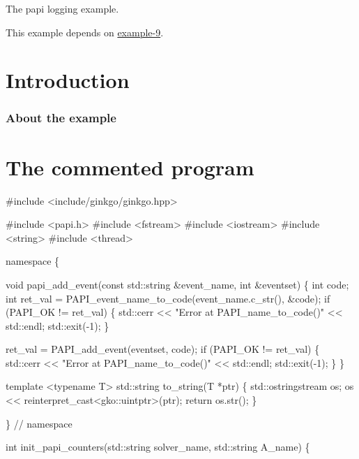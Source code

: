 The papi logging example.

This example depends on \hyperlink{example_9}{example-\/9}.

 \label{_Intro}%
 \label{_Introduction}%
\section*{Introduction}

\label{_Abouttheexample}%
\subsubsection*{About the example }

\label{_CommProg}%
 \section*{The commented program}


\begin{DoxyCode}
\textcolor{preprocessor}{#include <include/ginkgo/ginkgo.hpp>}


\textcolor{preprocessor}{#include <papi.h>}
\textcolor{preprocessor}{#include <fstream>}
\textcolor{preprocessor}{#include <iostream>}
\textcolor{preprocessor}{#include <string>}
\textcolor{preprocessor}{#include <thread>}


\textcolor{keyword}{namespace }\{


\textcolor{keywordtype}{void} papi\_add\_event(\textcolor{keyword}{const} std::string &event\_name, \textcolor{keywordtype}{int} &eventset)
\{
    \textcolor{keywordtype}{int} code;
    \textcolor{keywordtype}{int} ret\_val = PAPI\_event\_name\_to\_code(event\_name.c\_str(), &code);
    \textcolor{keywordflow}{if} (PAPI\_OK != ret\_val) \{
        std::cerr << \textcolor{stringliteral}{"Error at PAPI\_name\_to\_code()"} << std::endl;
        std::exit(-1);
    \}

    ret\_val = PAPI\_add\_event(eventset, code);
    \textcolor{keywordflow}{if} (PAPI\_OK != ret\_val) \{
        std::cerr << \textcolor{stringliteral}{"Error at PAPI\_name\_to\_code()"} << std::endl;
        std::exit(-1);
    \}
\}


\textcolor{keyword}{template} <\textcolor{keyword}{typename} T>
std::string to\_string(T *ptr)
\{
    std::ostringstream os;
    os << reinterpret\_cast<gko::uintptr>(ptr);
    \textcolor{keywordflow}{return} os.str();
\}


\}  \textcolor{comment}{// namespace}


\textcolor{keywordtype}{int} init\_papi\_counters(std::string solver\_name, std::string A\_name)
\{
\end{DoxyCode}


